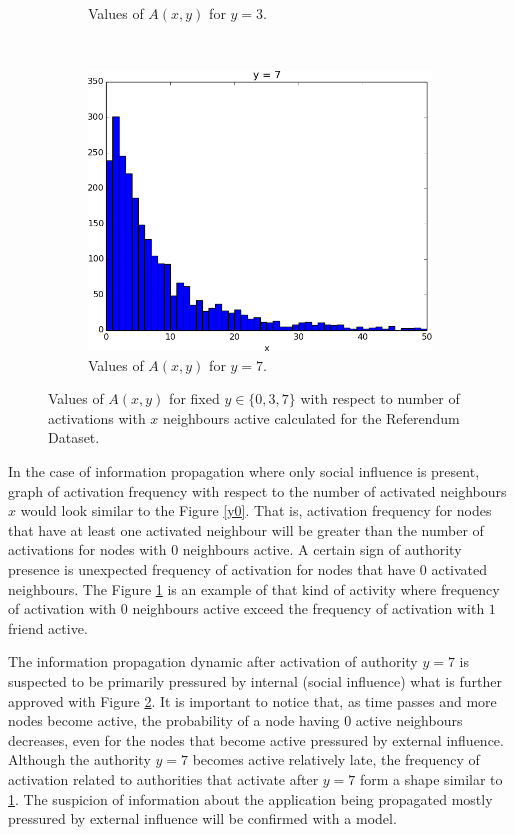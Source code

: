 \documentclass[times, utf8, zavrsni]{fer}
\begin{document}
\begin{figure}
\begin{subfigure}{\textwidth}
\caption{Values of $A(x, y)$ for $y=3$.}
\label{jutarnji1}
\end{subfigure}\\[1ex]
\begin{subfigure}{\textwidth}
\centering
\includegraphics[scale=0.4]{034.png}
\caption{Values of $A(x, y)$ for $y=7$.}
\label{034}
\end{subfigure}
\caption{Values of $A(x,y)$ for fixed $y \in \{0, 3, 7\}$ with respect to number of activations with $x$ neighbours active calculated for the Referendum Dataset.}
\label{fig:test}
\end{figure}

In the  case of information propagation where only social influence is present, graph of activation frequency  with respect to the number of activated neighbours $x$ would look similar to the Figure \ref{y0}. That is, activation frequency for nodes that have at least one activated neighbour will be greater than the number of activations for nodes with $0$ neighbours active.  A certain sign of authority presence is unexpected frequency of activation for nodes that have $0$ activated neighbours. The Figure \ref{jutarnji1} is an example of that kind of activity where frequency of activation with $0$ neighbours active exceed the frequency of activation with $1$ friend active. 

The information propagation dynamic after activation of authority $y=7$ is suspected to be primarily pressured by internal (social influence) what is further approved with Figure \ref{034}. It is important to notice that, as time passes and more nodes become active, the probability of a node having $0$ active neighbours decreases, even for the nodes that become active pressured by external influence. Although the authority $y = 7$ becomes active relatively late, the frequency of activation related to authorities that activate after $y = 7$ form a shape similar to \ref{jutarnji1}. The suspicion of information about the application being propagated mostly pressured by external influence will be confirmed with a model.
\end{document}
